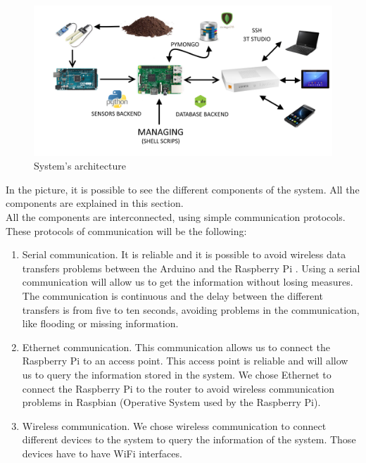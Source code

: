 \begin{figure}[H]
\begin{centering}
\includegraphics[scale=0.15]{IMGS/SYSTEM_SCHEMA.png}
\caption{System's architecture \label{System's architecture}}
\end{centering}
\end{figure}

In the picture, it is possible to see the different components of the system. All the components are explained in this section.\\

All the components are interconnected, using simple communication protocols. These protocols of communication will be the following:

\begin{enumerate}

\item Serial communication. It is reliable and it is possible to avoid wireless data transfers problems between the Arduino and the Raspberry Pi \cite{what_is_raspberry_pi, raspberry_pi}. Using a serial communication will allow us to get the information without losing measures. The communication is continuous and the delay between the different transfers is from five to ten seconds, avoiding problems in the communication, like flooding or missing information.

\item Ethernet communication. This communication allows us to connect the Raspberry Pi to an access point. This access point is reliable and will allow us to query the information stored in the system. We chose Ethernet to connect the Raspberry Pi to the router to avoid wireless communication problems in Raspbian \cite{raspbian} (Operative System used by the Raspberry Pi).

\item Wireless communication. We chose wireless communication to connect different devices to the system to query the information of the system. Those devices have to have WiFi interfaces.

\end{enumerate}

